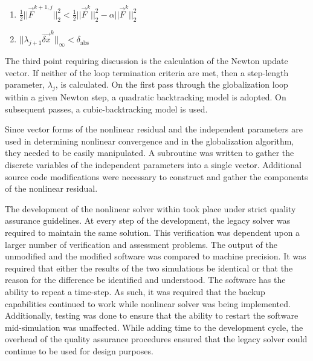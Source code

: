 \begin{enumerate}
\item{$\frac{1}{2}||\vec{F}^{k+1, j}||^{2}_{2} < \frac{1}{2}||\vec{F}^{k}||^{2}_{2} - \alpha ||\vec{F}^{k}||^{2}_{2}$ }
\item{$||\lambda_{j+1} \vec{\delta x}^{k}||_{\infty} < \delta_{\text{abs}}$}
\end{enumerate}

The third point requiring discussion is the calculation of the Newton update vector.
If neither of the loop termination criteria are met, then a step-length parameter, $\lambda_j$, is calculated.
On the first pass through the globalization loop within a given Newton step, a quadratic backtracking model is adopted.
On subsequent passes, a cubic-backtracking model is used.
 
Since vector forms of the nonlinear residual and the independent parameters are used in determining nonlinear convergence and in the globalization algorithm, they needed to be easily manipulated.
A subroutine was written to gather the discrete variables of the independent parameters into a single vector.
Additional source code modifications were necessary to construct and gather the components of the nonlinear residual.

The development of the nonlinear solver within \cobra{} took place under strict quality assurance guidelines.
At every step of the development, the legacy solver was required to maintain the same solution.
This verification was dependent upon a larger number of verification and assessment problems.
The output of the unmodified \cobra{} and the modified \cobra{} software was compared to machine precision.
It was required that either the results of the two simulations be identical or that the reason for the difference be identified and understood.
The \cobra{} software has the ability to repeat a time-step.
As such, it was required that the backup capabilities continued to work while nonlinear solver was being implemented.
Additionally, testing was done to ensure that the ability to restart the software mid-simulation was unaffected.
While adding time to the development cycle, the overhead of the quality assurance procedures ensured that the legacy solver could continue to be used for design purposes.

